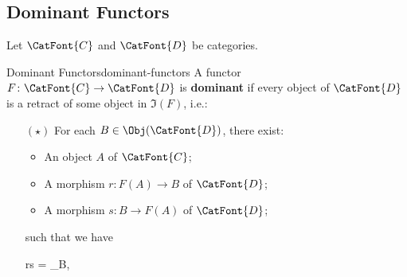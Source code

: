 \subsection{Dominant Functors}\label{subsection-dominant-functors}
Let $\CatFont{C}$ and $\CatFont{D}$ be categories.
\begin{definition}{Dominant Functors}{dominant-functors}%
    A functor $F\colon\CatFont{C}\to\CatFont{D}$ is \textbf{dominant} if every object of $\CatFont{D}$ is a retract of some object in $\Im(F)$, i.e.:
    \begin{itemize}%
        \item[$(\star)$]For each $B\in\Obj(\CatFont{D})$, there exist:
            \begin{itemize}%
                \item An object $A$ of $\CatFont{C}$;
                \item A morphism $r\colon F(A)\to B$ of $\CatFont{D}$;
                \item A morphism $s\colon B\to F(A)$ of $\CatFont{D}$;
            \end{itemize}%
            such that we have
            \begin{webcompile}
                r\circ s%
                =%
                \id_{B},%
                \quad
            \end{webcompile}
    \end{itemize}%
\end{definition}
